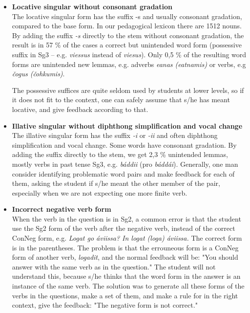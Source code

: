 \documentclass[a4paper,12pt]{article}
\begin{document}
\begin{itemize}

\item \textbf{Locative singular without consonant gradation} \\
The locative singular form has the suffix -s and usually consonant gradation, compared to the base form. In our pedagogical lexicon there are 1512 nouns. By adding the suffix \textit{-s} directly to the stem without consonant gradation, the result is in 57 \% of the cases a correct but unintended word form (possessive suffix in Sg3 -- e.g. \textit{viessus} instead of \textit{viesus}). Only 0,5 \% of the resulting word forms are unintended new lemmas, e.g. adverbs \textit{eanas  (eatnamis)} or verbs, e.g \textit{čogus (čohkumis)}.

The possessive suffices are quite seldom used by students at lower levels, so if it does not fit to the context, one can safely assume that s/he has meant locative, and give feedback according to that. 

\item \textbf{Illative singular without diphthong simplification and vocal change}\\
The illative singular form has the suffix \textit{-i} or \textit{-ii} and often  diphthong simplification and vocal change. Some words have consonant gradation. By adding the suffix directly to the stem, we get 2,3 \% unintended lemmas, mostly verbs in past tense Sg3, e.g. \textit{báddii}  (pro \textit{báddái}). Generally, one man consider identifying problematic word pairs and make feedback for each of them, asking the student if s/he meant the other member of the pair, especially when we are not expecting one more finite verb.
\newpage
\item \textbf{Incorrect negative verb form}\\
When the verb in the question is in Sg2, a common error is that the student use the Sg2 form of the verb after the negative verb, instead of the correct ConNeg form, e.g. \textit{Logat go áviissa? In logat (loga) áviissa.} The correct form is in the parentheses. The problem is that the errouneous form is a ConNeg form of another verb, \textit{logadit}, and the normal feedback will be: "You should answer with the same verb as in the question." The student will not understand this, because s/he thinks that the word form in the answer is an instance of the same verb. The solution was to generate all these forms of the verbs in the questions, make a set of them, and make a rule for in the right context, give the feedback: "The negative form is not correct." 
\end{itemize}
\end{document}
